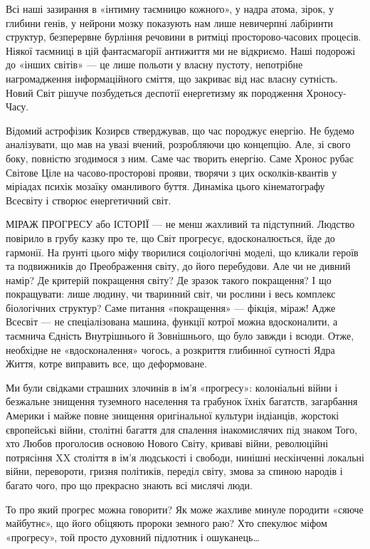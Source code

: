 Всі наші зазирання в «інтимну таємницю кожного», у надра атома, зірок, у
глибини генів, у нейрони мозку показують нам лише невичерпні лабіринти
структур, безперервне бурління речовини в ритміці просторово-часових процесів.
Ніякої таємниці в цій фантасмагорії антижиття ми не відкриємо. Наші подорожі до
«інших світів» — це лише польоти у власну пустоту, непотрібне нагромадження
інформаційного сміття, що закриває від нас власну сутність. Новий Світ рішуче
позбудеться деспотії енергетизму як породження Хроносу-Часу.

Відомий астрофізик Козирєв стверджував, що час породжує енергію. Не будемо
аналізувати, що мав на увазі вчений, розробляючи цю концепцію. Але, зі свого
боку, повністю згодимося з ним. Саме час творить енергію. Саме Хронос рубає
Світове Ціле на часово-просторові прояви, творячи з цих осколків-квантів у
міріадах психік мозаїку оманливого буття. Динаміка цього кінематографу Всесвіту
і створює енергетичний світ.

МІРАЖ ПРОГРЕСУ або ІСТОРІЇ — не менш жахливий та підступний. Людство повірило в
грубу казку про те, що Світ прогресує, вдосконалюється, йде до гармонії. На
ґрунті цього міфу творилися соціологічні моделі, що кликали героїв та
подвижників до Преображення світу, до його перебудови. Але чи не дивний намір?
Де критерій покращення світу? Де зразок такого покращення? І що покращувати:
лише людину, чи тваринний світ, чи рослини і весь комплекс біологічних
структур? Саме питання «покращення» — фікція, міраж! Адже Всесвіт — не
спеціалізована машина, функції котрої можна вдосконалити, а таємнича Єдність
Внутрішнього й Зовнішнього, що було завжди і всюди. Отже, необхідне не
«вдосконалення» чогось, а розкриття глибинної сутності Ядра Життя, котре
виправить все, що деформоване.

Ми були свідками страшних злочинів в ім’я «прогресу»: колоніальні війни і
безжальне знищення туземного населення та грабунок їхніх багатств, загарбання
Америки і майже повне знищення оригінальної культури індіанців, жорстокі
європейські війни, столітні багаття для спалення інакомислячих під знаком Того,
хто Любов проголосив основою Нового Світу, криваві війни, революційні
потрясіння XX століття в ім’я людськості і свободи, нинішні нескінченні
локальні війни, перевороти, гризня політиків, переділ світу, змова за спиною
народів і багато чого, про що прекрасно знають всі мислячі люди.

То про який прогрес можна говорити? Як може жахливе минуле породити «сяюче
майбутнє», що його обіцяють пророки земного раю? Хто спекулює міфом «прогресу»,
той просто духовний підлотник і ошуканець…

